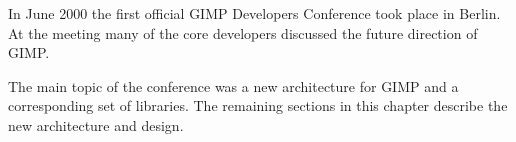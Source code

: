 In June 2000 the first official GIMP Developers Conference took place in
Berlin. At the meeting many of the core developers discussed the future
direction of GIMP.

The main topic of the conference was a new architecture for GIMP and a
corresponding set of libraries. The remaining sections in this chapter describe
the new architecture and design.
